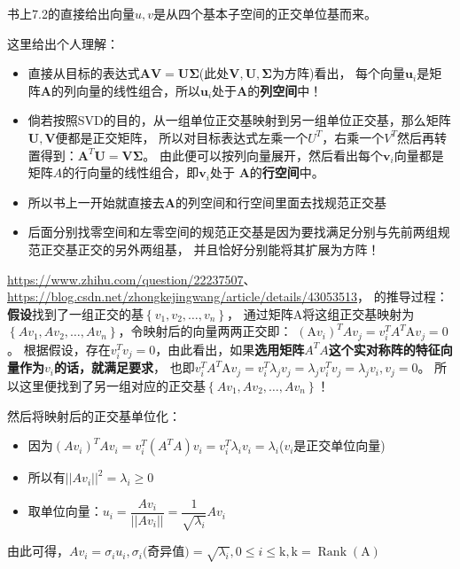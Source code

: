 书上7.2的直接给出向量$u,v$是从四个基本子空间的正交单位基而来。

这里给出个人理解：
\begin{itemize}
    \item 直接从目标的表达式$\bm{A V=U \Sigma}$(此处$\bm{V,U,\Sigma}$为方阵)看出，
    每个向量$\bm{u}_i$是矩阵$\bm{A}$的列向量的线性组合，所以$\bm{u}_i$处于$\bm{A}$的\textbf{列空间}中！
    \item 倘若按照SVD的目的，从一组单位正交基映射到另一组单位正交基，那么矩阵$\bm{U,V}$便都是正交矩阵，
    所以对目标表达式左乘一个$U^T$，右乘一个$V^T$然后再转置得到：$\bm{A}^T\bm{U} = \bm{V\Sigma}$。
    由此便可以按列向量展开，然后看出每个$\bm{v}_i$向量都是矩阵$A$的行向量的线性组合，即$\bm{v}_i$处于
    $\bm{A}$的\textbf{行空间}中。
    \item 所以书上一开始就直接去$\bm{A}$的列空间和行空间里面去找规范正交基
    \item 后面分别找零空间和左零空间的规范正交基是因为要找满足分别与先前两组规范正交基正交的另外两组基，
    并且恰好分别能将其扩展为方阵！
\end{itemize}

\url{https://www.zhihu.com/question/22237507}、\url{https://blog.csdn.net/zhongkejingwang/article/details/43053513}，
的推导过程：
\\
\textbf{假设}找到了一组正交的基$\left\{v_{1}, v_{2}, \ldots, v_{n}\right\}$，
通过矩阵A将这组正交基映射为$\left\{A v_{1}, A v_{2}, \ldots, A v_{n}\right\}$，令映射后的向量两两正交即：
$\left(\mathrm{A} v_{i}\right)^{T} A v_{j}=v_{i}^{T} A^{T} \mathrm{A} v_{j}=0$。
根据假设，存在$v_{i}^{T} v_{j}=0$，由此看出，如果\textbf{选用矩阵$A^TA$这个实对称阵的特征向量作为$v_i$的话，就满足要求}，
也即$v_{i}^{T} A^{T} \mathrm{A} v_{j}= v_{i}^{T} \lambda_{j} v_{j} =\lambda_{j} v_{i}^{T} v_{j} =\lambda_{j} v_{i}, v_{j}=0$。
所以这里便找到了另一组对应的正交基$\left\{A v_{1}, A v_{2}, \ldots, A v_{n}\right\}$！

然后将映射后的正交基单位化：
\begin{itemize}
    \item 因为$(A v_{i})^T A v_{i}=v_{i}^T (A^TA)v_i = v_{i}^T \lambda_{i} v_{i}=\lambda_{i}$($v_i$是正交单位向量)
    \item 所以有$\left||A v_{i}\right||^{2}=\lambda_{i} \geq 0$
    \item 取单位向量：$u_{i}=\dfrac{A v_{i}}{\left||A v_{i}\right||}=\dfrac{1}{\sqrt{\lambda_{i}}} A v_{i}$
\end{itemize}
由此可得，$A v_{i}=\sigma_{i} u_{i}, \sigma_{i}($奇异值$)=\sqrt{\lambda_{i}}, 0 \leq i \leq \mathrm{k}, \mathrm{k}=\operatorname{Rank}(\mathrm{A})$

